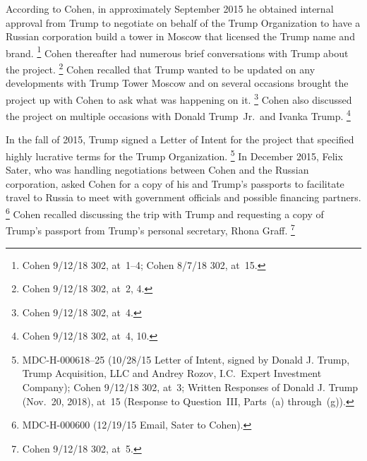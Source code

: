 According to Cohen, in approximately September 2015 he obtained internal approval from Trump to negotiate on behalf of the Trump Organization to have a Russian corporation build a tower in Moscow that licensed the Trump name and brand.%
\footnote{Cohen 9/12/18 302, at~1--4;
Cohen 8/7/18 302, at~15.}
Cohen thereafter had numerous brief conversations with Trump about the project.%
\footnote{Cohen 9/12/18 302, at~2, 4.}
Cohen recalled that Trump wanted to be updated on any developments with Trump Tower Moscow and on several occasions brought the project up with Cohen to ask what was happening on it.%
\footnote{Cohen 9/12/18 302, at~4.}
Cohen also discussed the project on multiple occasions with Donald Trump~Jr.\ and Ivanka Trump.%
\footnote{Cohen 9/12/18 302, at~4, 10.}

In the fall of 2015, Trump signed a Letter of Intent for the project that specified highly lucrative terms for the Trump Organization.%
\footnote{MDC-H-000618--25 (10/28/15 Letter of Intent, signed by Donald J. Trump, Trump Acquisition, LLC and Andrey Rozov, I.C.~Expert Investment Company);
Cohen 9/12/18 302, at~3;
Written Responses of Donald J. Trump (Nov.~20, 2018), at~15 (Response to Question~III, Parts~(a) through~(g)).}
In December 2015, Felix Sater, who was handling negotiations between Cohen and the Russian corporation, asked Cohen for a copy of his and Trump's passports to facilitate travel to Russia to meet with government officials and possible financing partners.%
\footnote{MDC-H-000600 (12/19/15 Email, Sater to Cohen).}
Cohen recalled discussing the trip with Trump and requesting a copy of Trump's passport from Trump's personal secretary, Rhona Graff.%
\footnote{Cohen 9/12/18 302, at~5.}

